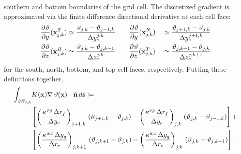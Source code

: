 southern and bottom boundaries of the grid cell.
The discretized gradient is approximated via the finite difference
directional derivative at each cell face:
\begin{equation*}
    \begin{aligned}
        \frac{\partial^{} {\vartheta}}{\partial {y}^{}}(\mathbf{x}_{j,k}^S)
        &\simeq \dfrac{\vartheta_{j,k} - \vartheta_{j-1,k}}{\Delta y_c^{j,k}}
        \qquad
        \frac{\partial^{} {\vartheta}}{\partial {y}^{}}(\mathbf{x}_{j,k}^N)
        &&\simeq \dfrac{\vartheta_{j+1,k} - \vartheta_{j,k}}{\Delta y_c^{j+1,k}}
        \\
        \frac{\partial^{} {\vartheta}}{\partial {z}^{}}(\mathbf{x}_{j,k}^B)
        &\simeq \dfrac{\vartheta_{j,k} - \vartheta_{j,k-1}}{\Delta z_c^{j,k}}
        \qquad
        \frac{\partial^{} {\vartheta}}{\partial {z}^{}}(\mathbf{x}_{j,k}^T)
        &&\simeq \dfrac{\vartheta_{j,k+1} - \vartheta_{j,k}}{\Delta z_c^{j,k+1}}
    \end{aligned}
\end{equation*}
for the south, north, bottom, and top cell faces, respectively.
Putting these definitions together,
\begin{equation}
    \begin{aligned}
        \int_{\partial E_{j,k}}
        &K(\mathbf{x})\nabla\,\vartheta(\mathbf{x})\,
        \cdot \hat{\mathbf{n}} \, d\mathbf{s}
        \coloneqq \\
        &\left[
            \left(
            \dfrac{\kappa^{vy} \, \Delta r_f}{\Delta y_c}
            \right)_{j+1,k} \,
            (\vartheta_{j+1,k} - \vartheta_{j,k}) -
            \left(
            \dfrac{\kappa^{vy} \, \Delta r_f}{\Delta y_c}
            \right)_{j,k} \,
            (\vartheta_{j,k} - \vartheta_{j-1,k})
        \right]+
        \\
        &\left[
            \left(
            \dfrac{\kappa^{wz} \, \Delta y_g}{\Delta r_c}
            \right)_{j,k+1} \,
            (\vartheta_{j,k+1} - \vartheta_{j,k}) -
            \left(
            \dfrac{\kappa^{wz} \, \Delta y_g}{\Delta r_c}
            \right)_{j,k} \,
            (\vartheta_{j,k} - \vartheta_{j,k-1})
        \right]
        \, .
    \end{aligned}
    \label{eq:big_laplacian}
\end{equation}
